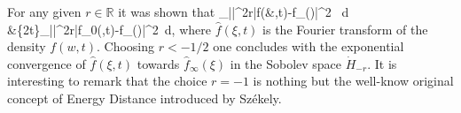 \documentclass{article}
\newcommand{\f}{{\ensuremath{\varphi}}}
\renewcommand{\le}{\leqslant}
\newcommand{\fer}[1]{(\ref{#1})}
\newenvironment{equations}{\equation\aligned}{\endaligned\endequation}
\newcommand{\R}{\mathbb R}
\def\f{\hat f}
\def\R{\mathbb{R}}
\begin{document}
% 
For any given $r\in \R$ it was shown that  
\begin{equations}
    \int_\R |\xi|^{2r}|\hat f(&\xi,t)-\hat f_\infty(\xi)|^2 \, d\xi \le \\  &\exp\left\{2t\right\}\int_\R |\xi|^{2r}|\hat f_0(\xi,t)-\f_\infty(\xi)|^2\, d\xi,
\end{equations}
where $\f(\xi,t)$ is the Fourier transform of the density $f(w,t)$. Choosing   {$r<-1/2$} one concludes with the {exponential convergence} of   $\f(\xi,t)$ towards $\hat f_\infty(\xi)$  in the Sobolev space $\dot{H}_{-r}$.
It is interesting to remark that the choice $r = -1$ is nothing but the well-know original concept of Energy Distance introduced by Sz\'ekely.\cite{Sze89,Sze03}
% 


\end{document}
